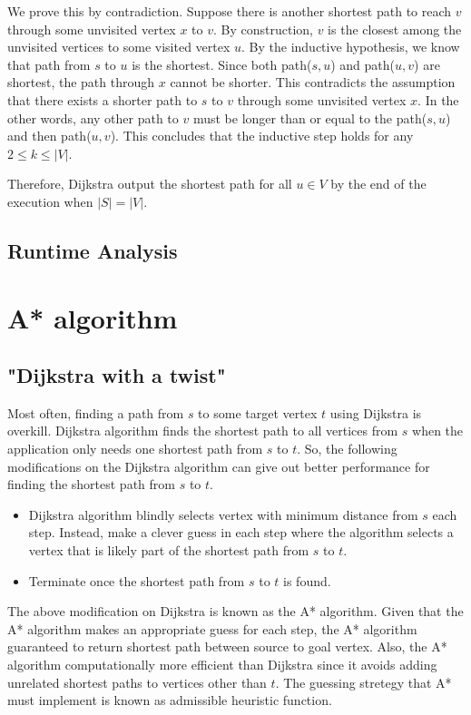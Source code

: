 \documentclass{article}
\begin{document}
We prove this by contradiction. Suppose there is another shortest path to reach $v$ through some unvisited vertex $x$ to $v$. By construction, $v$ is the closest among the unvisited vertices to some visited vertex $u$. By the inductive hypothesis, we know that path from $s$ to $u$ is the shortest. Since both path($s,u$) and path($u,v$) are shortest, the path through $x$ cannot be shorter. This contradicts the assumption that there exists a shorter path to $s$ to $v$ through some unvisited vertex $x$.
In the other words, any other path to $v$ must be longer than or equal to the path($s, u$) and then path($u, v$). This concludes that the inductive step holds for any $2 \leq k \leq |V|$. 

Therefore, Dijkstra output the shortest path for all $u \in V$ by the end of the execution when $|S| = |V|$.


\subsection{Runtime Analysis}

\section{A* algorithm}
\subsection{"Dijkstra with a twist" \cite{Buckland}}
Most often, finding a path from $s$ to some target vertex $t$ using Dijkstra is overkill. Dijkstra algorithm finds the shortest path to all vertices from $s$ when the application only needs one shortest path from $s$ to $t$. So, the following modifications on the Dijkstra algorithm can give out better performance for finding the shortest path from $s$ to $t$. 
\begin{itemize}
    \item Dijkstra algorithm blindly selects vertex with minimum distance from $s$ each step. Instead, make a clever guess in each step where the algorithm selects a vertex that is likely part of the shortest path from $s$ to $t$.\cite{Buckland, HNR}
    \item Terminate once the shortest path from $s$ to $t$ is found.
\end{itemize}
The above modification on Dijkstra is known as the A* algorithm. Given that the A* algorithm makes an appropriate guess for each step, the A* algorithm guaranteed to return shortest path between source to goal vertex. Also, the A* algorithm computationally more efficient than Dijkstra since it avoids adding unrelated shortest paths to vertices other than $t$. The guessing stretegy that A* must implement is known as admissible heuristic function.
\end{document}
